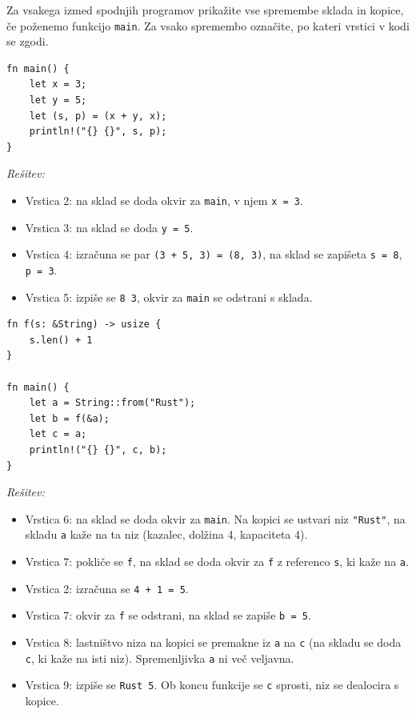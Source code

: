 \documentclass[arhiv]{../izpit}
\begin{document}


\naloga[\tocke{10}]

Za vsakega izmed spodnjih programov prikažite vse spremembe sklada in kopice, če poženemo funkcijo \texttt{main}. Za vsako spremembo označite, po kateri vrstici v kodi se zgodi.

\podnaloga
\begin{verbatim}
fn main() {
    let x = 3;
    let y = 5;
    let (s, p) = (x + y, x);
    println!("{} {}", s, p);
}
\end{verbatim}

\noindent
\emph{Rešitev:}
\begin{itemize}
  \item Vrstica 2: na sklad se doda okvir za \texttt{main}, v njem \texttt{x = 3}.
  \item Vrstica 3: na sklad se doda \texttt{y = 5}.
  \item Vrstica 4: izračuna se par \texttt{(3 + 5, 3) = (8, 3)}, na sklad se zapišeta \texttt{s = 8}, \texttt{p = 3}.
  \item Vrstica 5: izpiše se \texttt{8 3}, okvir za \texttt{main} se odstrani s sklada.
\end{itemize}

\podnaloga
\begin{verbatim}
fn f(s: &String) -> usize {
    s.len() + 1
}

fn main() {
    let a = String::from("Rust");
    let b = f(&a);
    let c = a;
    println!("{} {}", c, b);
}
\end{verbatim}

\noindent
\emph{Rešitev:}
\begin{itemize}
  \item Vrstica 6: na sklad se doda okvir za \texttt{main}. Na kopici se ustvari niz \texttt{"Rust"}, na skladu \texttt{a} kaže na ta niz (kazalec, dolžina 4, kapaciteta 4).
  \item Vrstica 7: pokliče se \texttt{f}, na sklad se doda okvir za \texttt{f} z referenco \texttt{s}, ki kaže na \texttt{a}.
  \item Vrstica 2: izračuna se \texttt{4 + 1 = 5}.
  \item Vrstica 7: okvir za \texttt{f} se odstrani, na sklad se zapiše \texttt{b = 5}.
  \item Vrstica 8: lastništvo niza na kopici se premakne iz \texttt{a} na \texttt{c} (na skladu se doda \texttt{c}, ki kaže na isti niz). Spremenljivka \texttt{a} ni več veljavna.
  \item Vrstica 9: izpiše se \texttt{Rust 5}. Ob koncu funkcije se \texttt{c} sprosti, niz se dealocira s kopice.
\end{itemize}
\end{document}
